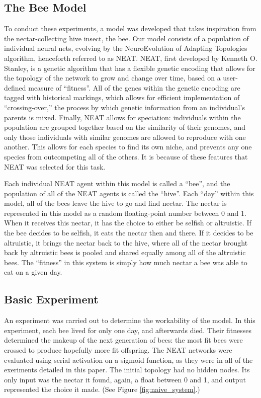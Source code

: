 \documentclass[twoside]{article}
\begin{document}
\begin{multicols}{2}
		\subsection{The Bee Model} %
		\label{sub:the_bee_model}
			To conduct these experiments, a model was developed that takes inspiration from the nectar-collecting hive insect, the bee. Our model consists of a population of individual neural nets, evolving by the NeuroEvolution of Adapting Topologies algorithm, henceforth referred to as NEAT.\cite{neat} NEAT, first developed by Kenneth O. Stanley, is a genetic algorithm that has a flexible genetic encoding that allows for the topology of the network to grow and change over time, based on a user-defined measure of ``fitness''. All of the genes within the genetic encoding are tagged with historical markings, which allows for efficient implementation of ``crossing-over,'' the process by which genetic information from an individual's parents is mixed. Finally, NEAT allows for speciation: individuals within the population are grouped together based on the similarity of their genomes, and only those individuals with similar genomes are allowed to reproduce with one another. This allows for each species to find its own niche, and prevents any one species from outcompeting all of the others. It is because of these features that NEAT was selected for this task.

			Each individual NEAT agent within this model is called a ``bee'', and the population of all of the NEAT agents is called the ``hive''. Each ``day'' within this model, all of the bees leave the hive to go and find nectar. The nectar is represented in this model as a random floating-point number between 0 and 1. When it receives this nectar, it has the choice to either be selfish or altruistic. If the bee decides to be selfish, it eats the nectar then and there. If it decides to be altruistic, it brings the nectar back to the hive, where all of the nectar brought back by altruistic bees is pooled and shared equally among all of the altruistic bees. The ``fitness'' in this system is simply how much nectar a bee was able to eat on a given day.

		\subsection{Basic Experiment} %
		\label{sub:basic_experiment}
			An experiment was carried out to determine the workability of the model. In this experiment, each bee lived for only one day, and afterwards died. Their fitnesses determined the makeup of the next generation of bees: the most fit bees were crossed to produce hopefully more fit offspring. The NEAT networks were evaluated using serial activation on a sigmoid function, as they were in all of the exeriments detailed in this paper. The initial topology had no hidden nodes. Its only input was the nectar it found, again, a float between 0 and 1, and output represented the choice it made. (See Figure \ref{fig:naive_system}.)


\end{multicols}
\end{document}
